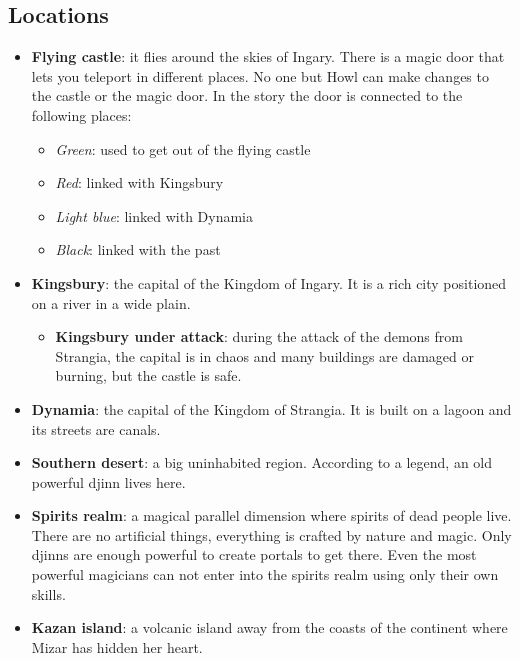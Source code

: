 \subsection{Locations}
\begin{itemize}
	\item \textbf{Flying castle}: it flies around the skies of Ingary. There is a magic door that lets you teleport in different places. No one but Howl can make changes to the castle or the magic door. In the story the door is connected to the following places:
	\begin{itemize}
		\item \textit{Green}: used to get out of the flying castle
		\item \textit{Red}: linked with Kingsbury
		\item \textit{Light blue}: linked with Dynamia
		\item \textit{Black}: linked with the past
	\end{itemize}
	
	\item \textbf{Kingsbury}: the capital of the Kingdom of Ingary. It is a rich city positioned on a river in a wide plain.
	
\begin{itemize}
	\item \textbf{Kingsbury under attack}: during the attack of the demons from Strangia, the capital is in chaos and many buildings are damaged or burning, but the castle is safe.
\end{itemize}
	
	\item \textbf{Dynamia}: the capital of the Kingdom of Strangia. It is built on a lagoon and its streets are canals.
	
	\item \textbf{Southern desert}: a big uninhabited region. According to a legend, an old powerful djinn lives here.
	
	\item \textbf{Spirits realm}: a magical parallel dimension where spirits of dead people live. There are no artificial things, everything is crafted by nature and magic. Only djinns are enough powerful to create portals to get there. Even the most powerful magicians can not enter into the spirits realm using only their own skills.

	\item \textbf{Kazan island}: a volcanic island away from the coasts of the continent where Mizar has hidden her heart.
	
\end{itemize}
